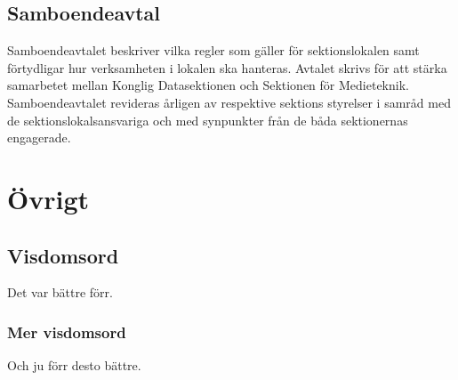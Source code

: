 \documentclass{dgovdoc}
\begin{document}
\subsection{Samboendeavtal}
Samboendeavtalet beskriver vilka regler som gäller för sektionslokalen samt förtydligar
hur verksamheten i lokalen ska hanteras. Avtalet skrivs för att stärka samarbetet mellan
Konglig Datasektionen och Sektionen för Medieteknik. Samboendeavtalet revideras
årligen av respektive sektions styrelser i samråd med de sektionslokalsansvariga och
med synpunkter från de båda sektionernas engagerade.
\section{Övrigt}

\subsection{Visdomsord}

Det var bättre förr.

\subsubsection{Mer visdomsord}

Och ju förr desto bättre.
\end{document}
